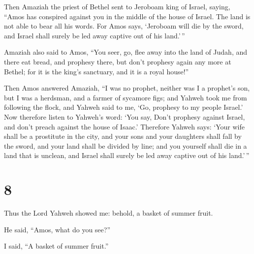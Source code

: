  Then Amaziah the priest of Bethel sent to Jeroboam king
of Israel, saying, ``Amos has conspired against you in the middle of the
house of Israel. The land is not able to bear all his words.
 For Amos says, `Jeroboam will die by the sword, and
Israel shall surely be led away captive out of his land.'\,''

 Amaziah also said to Amos, ``You seer, go, flee away
into the land of Judah, and there eat bread, and prophesy there,
 but don't prophesy again any more at Bethel; for it is
the king's sanctuary, and it is a royal house!''

 Then Amos answered Amaziah, ``I was no prophet, neither
was I a prophet's son, but I was a herdsman, and a farmer of sycamore
figs;  and Yahweh took me from following the flock, and
Yahweh said to me, `Go, prophesy to my people Israel.' 
Now therefore listen to Yahweh's word: `You say, Don't prophesy against
Israel, and don't preach against the house of Isaac.' 
Therefore Yahweh says: `Your wife shall be a prostitute in the city, and
your sons and your daughters shall fall by the sword, and your land
shall be divided by line; and you yourself shall die in a land that is
unclean, and Israel shall surely be led away captive out of his
land.'\,''

\hypertarget{section-7}{%
\section{8}\label{section-7}}

 Thus the Lord Yahweh showed me: behold, a basket of
summer fruit.

 He said, ``Amos, what do you see?''

I said, ``A basket of summer fruit.''

